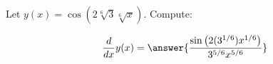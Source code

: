 \documentclass{ximera}
\author{Bart Snapp}
\begin{document}
\begin{exercise}
Let $y(x) = \cos \left(2 \sqrt[6]{3} \sqrt[6]{x}\right)$. Compute:

\[
\dd{x}y(x)
=\answer{\frac{\sin \left(2 (3^{1/6}) x^{1/6}\right)}{3^{5/6} x^{5/6} }}
\]
\end{exercise}
\end{document}
